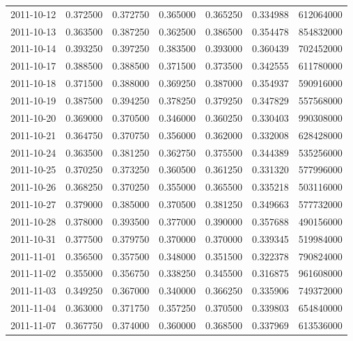 \begin{tabular}{lrrrrrr}
2011-10-12 &    0.372500 &    0.372750 &    0.365000 &    0.365250 &    0.334988 &   612064000 \\
2011-10-13 &    0.363500 &    0.387250 &    0.362500 &    0.386500 &    0.354478 &   854832000 \\
2011-10-14 &    0.393250 &    0.397250 &    0.383500 &    0.393000 &    0.360439 &   702452000 \\
2011-10-17 &    0.388500 &    0.388500 &    0.371500 &    0.373500 &    0.342555 &   611780000 \\
2011-10-18 &    0.371500 &    0.388000 &    0.369250 &    0.387000 &    0.354937 &   590916000 \\
2011-10-19 &    0.387500 &    0.394250 &    0.378250 &    0.379250 &    0.347829 &   557568000 \\
2011-10-20 &    0.369000 &    0.370500 &    0.346000 &    0.360250 &    0.330403 &   990308000 \\
2011-10-21 &    0.364750 &    0.370750 &    0.356000 &    0.362000 &    0.332008 &   628428000 \\
2011-10-24 &    0.363500 &    0.381250 &    0.362750 &    0.375500 &    0.344389 &   535256000 \\
2011-10-25 &    0.370250 &    0.373250 &    0.360500 &    0.361250 &    0.331320 &   577996000 \\
2011-10-26 &    0.368250 &    0.370250 &    0.355000 &    0.365500 &    0.335218 &   503116000 \\
2011-10-27 &    0.379000 &    0.385000 &    0.370500 &    0.381250 &    0.349663 &   577732000 \\
2011-10-28 &    0.378000 &    0.393500 &    0.377000 &    0.390000 &    0.357688 &   490156000 \\
2011-10-31 &    0.377500 &    0.379750 &    0.370000 &    0.370000 &    0.339345 &   519984000 \\
2011-11-01 &    0.356500 &    0.357500 &    0.348000 &    0.351500 &    0.322378 &   790824000 \\
2011-11-02 &    0.355000 &    0.356750 &    0.338250 &    0.345500 &    0.316875 &   961608000 \\
2011-11-03 &    0.349250 &    0.367000 &    0.340000 &    0.366250 &    0.335906 &   749372000 \\
2011-11-04 &    0.363000 &    0.371750 &    0.357250 &    0.370500 &    0.339803 &   654840000 \\
2011-11-07 &    0.367750 &    0.374000 &    0.360000 &    0.368500 &    0.337969 &   613536000 \\

\end{tabular}
